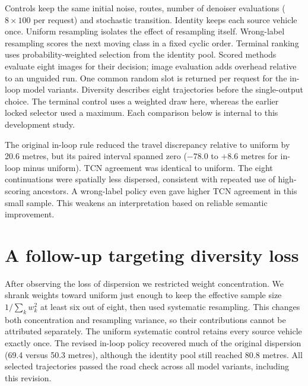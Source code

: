 Controls keep the same initial noise, routes, number of denoiser evaluations ($8\times100$ per request) and stochastic transition. Identity keeps each source vehicle once. Uniform resampling isolates the effect of resampling itself. Wrong-label resampling scores the next moving class in a fixed cyclic order. Terminal ranking uses probability-weighted selection from the identity pool. Scored methods evaluate eight images for their decision; image evaluation adds overhead relative to an unguided run. One common random slot is returned per request for the in-loop model variants. Diversity describes eight trajectories before the single-output choice. The terminal control uses a weighted draw here, whereas the earlier locked selector used a maximum. Each comparison below is internal to this development study.


The original in-loop rule reduced the travel discrepancy relative to uniform by 20.6 metres, but its paired interval spanned zero ($-78.0$ to $+8.6$ metres for in-loop minus uniform). TCN agreement was identical to uniform. The eight continuations were spatially less dispersed, consistent with repeated use of high-scoring ancestors. A wrong-label policy even gave higher TCN agreement in this small sample. This weakens an interpretation based on reliable semantic improvement.

\section{A follow-up targeting diversity loss}
After observing the loss of dispersion we restricted weight concentration. We shrank weights toward uniform just enough to keep the effective sample size $1/\sum_k w_k^2$ at least six out of eight, then used systematic resampling. This changes both concentration and resampling variance, so their contributions cannot be attributed separately. The uniform systematic control retains every source vehicle exactly once. The revised in-loop policy recovered much of the original dispersion (69.4 versus 50.3 metres), although the identity pool still reached 80.8 metres. All selected trajectories passed the road check across all model variants, including this revision.

